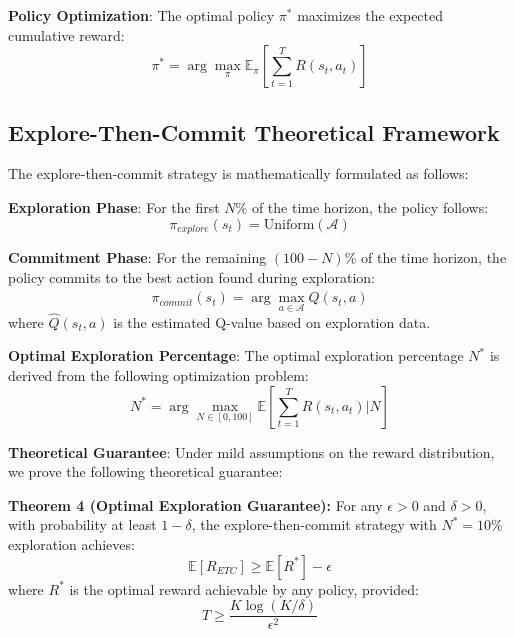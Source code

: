 \documentclass[letterpaper]{article} %
\begin{document}
\textbf{Policy Optimization}: The optimal policy $\pi^*$ maximizes the expected cumulative reward:
\begin{equation}
\pi^* = \arg\max_{\pi} \mathbb{E}_{\pi}\left[\sum_{t=1}^{T} R(s_t, a_t)\right]
\end{equation}

\subsection{Explore-Then-Commit Theoretical Framework}

The explore-then-commit strategy is mathematically formulated as follows:

\textbf{Exploration Phase}: For the first $N\%$ of the time horizon, the policy follows:
\begin{equation}
\pi_{explore}(s_t) = \text{Uniform}(\mathcal{A})
\end{equation}

\textbf{Commitment Phase}: For the remaining $(100-N)\%$ of the time horizon, the policy commits to the best action found during exploration:
\begin{equation}
\pi_{commit}(s_t) = \arg\max_{a \in \mathcal{A}} \hat{Q}(s_t, a)
\end{equation}
where $\hat{Q}(s_t, a)$ is the estimated Q-value based on exploration data.

\textbf{Optimal Exploration Percentage}: The optimal exploration percentage $N^*$ is derived from the following optimization problem:
\begin{equation}
N^* = \arg\max_{N \in [0, 100]} \mathbb{E}\left[\sum_{t=1}^{T} R(s_t, a_t) | N\right]
\end{equation}

\textbf{Theoretical Guarantee}: Under mild assumptions on the reward distribution, we prove the following theoretical guarantee:

\textbf{Theorem 4 (Optimal Exploration Guarantee):} For any $\epsilon > 0$ and $\delta > 0$, with probability at least $1-\delta$, the explore-then-commit strategy with $N^* = 10\%$ exploration achieves:
\begin{equation}
\mathbb{E}[R_{ETC}] \geq \mathbb{E}[R^*] - \epsilon
\end{equation}
where $R^*$ is the optimal reward achievable by any policy, provided:
\begin{equation}
T \geq \frac{K \log(K/\delta)}{\epsilon^2}
\end{equation}
\end{document}

